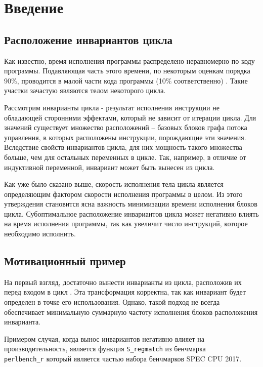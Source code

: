\chapter*{Введение}

\section*{Расположение инвариантов цикла}

Как известно, время исполнения программы распределено неравномерно по коду программы.
Подавляющая часть этого времени, по некоторым оценкам порядка 90\%, проводится в малой части кода программы (10\% соответственно) \cite{Aho_Ullman_focs}.
Такие участки зачастую являются телом некоторого цикла.

Рассмотрим инварианты цикла - результат исполнения инструкции не обладающей сторонними эффектами, который не зависит от итерации цикла.
Для значений существует множество расположений -- базовых блоков графа потока управления, в которых расположены инструкции, порождающие эти значения.
Вследствие свойств инвариантов цикла, для них мощность такого множества больше, чем для остальных переменных в цикле.
Так, например, в отличие от индуктивной переменной, инвариант может быть вынесен из цикла.

Как уже было сказано выше, скорость исполнения тела цикла является определяющим фактором скорости исполнения программы в целом.
Из этого утверждения становится ясна важность минимизации времени исполнения блоков цикла.
Субоптимальное расположение инвариантов цикла может негативно влиять на время исполнения программы, так как увеличит число инструкций, которое необходимо исполнить.

\section*{Мотивационный пример}

На первый взгляд, достаточно вынести инварианты из цикла, расположив их перед входом в цикл \cite{Aho_Sethi_Ullman_9_1_7}.
Эта трансформация корректна, так как инвариант будет определен в точке его использования.
Однако, такой подход не всегда обеспечивает минимальную суммарную частоту исполнения блоков расположения инварианта.

Примером случая, когда вынос инвариантов негативно влияет на производительность, является функция \texttt{S\_regmatch} из бенчмарка\\\texttt{perlbench\_r} который является частью набора бенчмарков SPEC CPU\textsuperscript{\tiny\textregistered} 2017.

